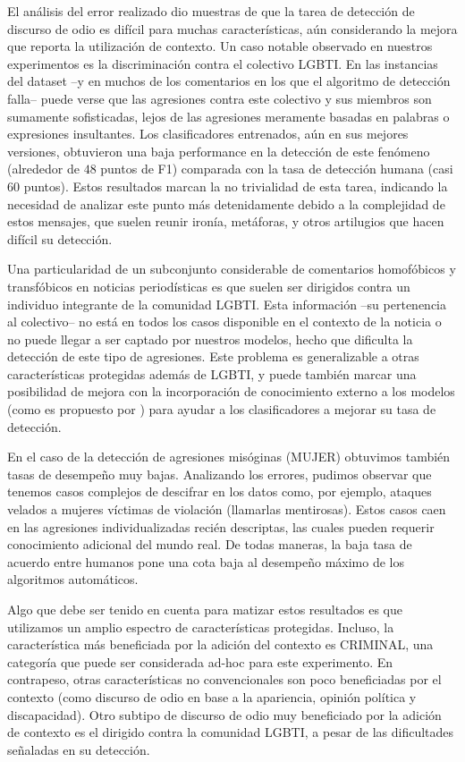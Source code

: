 El análisis del error realizado dio muestras de que la tarea de detección de discurso de odio es difícil para muchas características, aún considerando la mejora que reporta la utilización de contexto. Un caso notable observado en nuestros experimentos es la discriminación contra el colectivo LGBTI. En las instancias del dataset --y en muchos de los comentarios en los que el algoritmo de detección falla--  puede verse que las agresiones contra este colectivo y sus miembros son sumamente sofisticadas, lejos de las agresiones meramente basadas en palabras o expresiones insultantes. Los clasificadores entrenados, aún en sus mejores versiones, obtuvieron una baja performance en la detección de este fenómeno (alrededor de $48$ puntos de F1) comparada con la tasa de detección humana (casi $60$ puntos). Estos resultados marcan la no trivialidad de esta tarea, indicando la necesidad de analizar este punto más detenidamente debido a la complejidad de estos mensajes, que suelen reunir ironía, metáforas, y otros artilugios que hacen difícil su detección.

Una particularidad de un subconjunto considerable de comentarios homofóbicos y transfóbicos en noticias periodísticas es que suelen ser dirigidos contra un individuo integrante de la comunidad LGBTI. Esta información --su pertenencia al colectivo-- no está en todos los casos disponible en el contexto de la noticia o no puede llegar a ser captado por nuestros modelos, hecho que dificulta la detección de este tipo de agresiones. Este problema es generalizable a otras características protegidas además de LGBTI, y puede también marcar una posibilidad de mejora con la incorporación de conocimiento externo a los modelos (como es propuesto por \citet{liu2020kbert}) para ayudar a los clasificadores a mejorar su tasa de detección.

En el caso de la detección de agresiones misóginas (MUJER) obtuvimos también tasas de desempeño muy bajas. Analizando los errores, pudimos observar que tenemos casos complejos de descifrar en los datos como, por ejemplo, ataques velados a mujeres víctimas de violación (llamarlas mentirosas). Estos casos caen en las agresiones individualizadas recién descriptas, las cuales pueden requerir conocimiento adicional del mundo real. De todas maneras, la baja tasa de acuerdo entre humanos pone una cota baja al desempeño máximo de los algoritmos automáticos.

Algo que debe ser tenido en cuenta para matizar estos resultados es que utilizamos un amplio espectro de características protegidas. Incluso, la característica más beneficiada por la adición del contexto es CRIMINAL, una categoría que puede ser considerada ad-hoc para este experimento. En contrapeso, otras características no convencionales son poco beneficiadas por el contexto (como discurso de odio en base a la apariencia, opinión política y discapacidad). Otro subtipo de discurso de odio muy beneficiado por la adición de contexto es el dirigido contra la comunidad LGBTI, a pesar de las dificultades señaladas en su detección.

